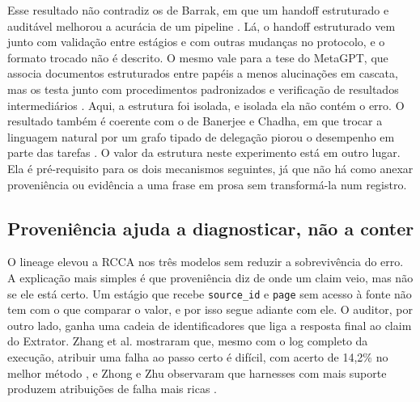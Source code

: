 Esse resultado não contradiz os de Barrak, em que um handoff estruturado e auditável melhorou a acurácia de um pipeline \cite{barrak2025traceability}.
Lá, o handoff estruturado vem junto com validação entre estágios e com outras mudanças no protocolo, e o formato trocado não é descrito.
O mesmo vale para a tese do MetaGPT, que associa documentos estruturados entre papéis a menos alucinações em cascata, mas os testa junto com procedimentos padronizados e verificação de resultados intermediários \cite{hong2023metagpt}.
Aqui, a estrutura foi isolada, e isolada ela não contém o erro.
O resultado também é coerente com o de Banerjee e Chadha, em que trocar a linguagem natural por um grafo tipado de delegação piorou o desempenho em parte das tarefas \cite{banerjee2026routed}.
O valor da estrutura neste experimento está em outro lugar. Ela é pré-requisito para os dois mecanismos seguintes, já que não há como anexar proveniência ou evidência a uma frase em prosa sem transformá-la num registro.

\subsection{Proveniência ajuda a diagnosticar, não a conter}\label{sec:disc-lineage}

O lineage elevou a RCCA nos três modelos sem reduzir a sobrevivência do erro.
A explicação mais simples é que proveniência diz de onde um claim veio, mas não se ele está certo.
Um estágio que recebe \texttt{source\_id} e \texttt{page} sem acesso à fonte não tem com o que comparar o valor, e por isso segue adiante com ele.
O auditor, por outro lado, ganha uma cadeia de identificadores que liga a resposta final ao claim do Extrator.
Zhang et al. mostraram que, mesmo com o log completo da execução, atribuir uma falha ao passo certo é difícil, com acerto de 14,2\% no melhor método \cite{zhang2025which}, e Zhong e Zhu observaram que harnesses com mais suporte produzem atribuições de falha mais ricas \cite{zhong2026harness}.

